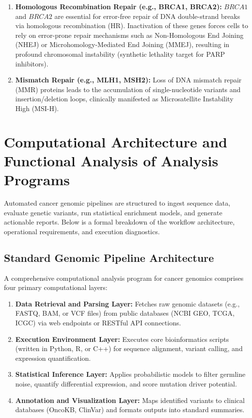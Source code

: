 \documentclass{article}
\begin{document}
\begin{enumerate}
    \item \textbf{Homologous Recombination Repair (e.g., BRCA1, BRCA2):}
    $BRCA1$ and $BRCA2$ are essential for error-free repair of DNA double-strand breaks via homologous recombination (HR). Inactivation of these genes forces cells to rely on error-prone repair mechanisms such as Non-Homologous End Joining (NHEJ) or Microhomology-Mediated End Joining (MMEJ), resulting in profound chromosomal instability (synthetic lethality target for PARP inhibitors).
    \item \textbf{Mismatch Repair (e.g., MLH1, MSH2):}
    Loss of DNA mismatch repair (MMR) proteins leads to the accumulation of single-nucleotide variants and insertion/deletion loops, clinically manifested as Microsatellite Instability High (MSI-H).
\end{enumerate}

\section{Computational Architecture and Functional Analysis of Analysis Programs}

Automated cancer genomic pipelines are structured to ingest sequence data, evaluate genetic variants, run statistical enrichment models, and generate actionable reports. Below is a formal breakdown of the workflow architecture, operational requirements, and execution diagnostics.

\subsection{Standard Genomic Pipeline Architecture}

A comprehensive computational analysis program for cancer genomics comprises four primary computational layers:

\begin{enumerate}
    \item \textbf{Data Retrieval and Parsing Layer:} Fetches raw genomic datasets (e.g., FASTQ, BAM, or VCF files) from public databases (NCBI GEO, TCGA, ICGC) via web endpoints or RESTful API connections.
    \item \textbf{Execution Environment Layer:} Executes core bioinformatics scripts (written in Python, R, or C++) for sequence alignment, variant calling, and expression quantification.
    \item \textbf{Statistical Inference Layer:} Applies probabilistic models to filter germline noise, quantify differential expression, and score mutation driver potential.
    \item \textbf{Annotation and Visualization Layer:} Maps identified variants to clinical databases (OncoKB, ClinVar) and formats outputs into standard summaries.
\end{enumerate}
\end{document}
